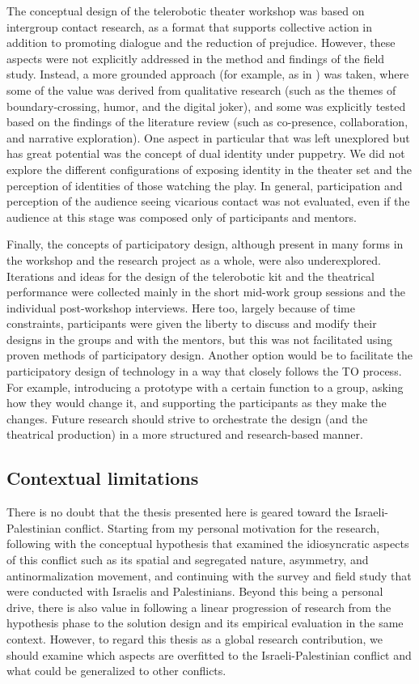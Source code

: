\documentclass[dissertation,math,vertlayout,pdfa,colorlinks]{aaltoseries}
\begin{document}
The conceptual design of the telerobotic theater workshop was based on intergroup contact research, as a format that supports collective action in addition to promoting dialogue and the reduction of prejudice. However, these aspects were not explicitly addressed in the method and findings of the field study. Instead, a more grounded approach (for example, as in \cite{glaserBasicsGroundedTheory1992}) was taken, where some of the value was derived from qualitative research (such as the themes of boundary-crossing, humor, and the digital joker), and some was explicitly tested based on the findings of the literature review (such as co-presence, collaboration, and narrative exploration). One aspect in particular that was left unexplored but has great potential was the concept of dual identity under puppetry. We did not explore the different configurations of exposing identity in the theater set and the perception of identities of those watching the play. In general, participation and perception of the audience seeing vicarious contact was not evaluated, even if the audience at this stage was composed only of participants and mentors.

Finally, the concepts of participatory design, although present in many forms in the workshop and the research project as a whole, were also underexplored. Iterations and ideas for the design of the telerobotic kit and the theatrical performance were collected mainly in the short mid-work group sessions and the individual post-workshop interviews. Here too, largely because of time constraints, participants were given the liberty to discuss and modify their designs in the groups and with the mentors, but this was not facilitated using proven methods of participatory design. Another option would be to facilitate the participatory design of technology in a way that closely follows the TO process. For example, introducing a prototype with a certain function to a group, asking how they would change it, and supporting the participants as they make the changes. Future research should strive to orchestrate the design (and the theatrical production) in a more structured and research-based manner.


\subsection{Contextual limitations}
There is no doubt that the thesis presented here is geared toward the Israeli-Palestinian conflict. Starting from my personal motivation for the research, following with the conceptual hypothesis that examined the idiosyncratic aspects of this conflict such as its spatial and segregated nature, asymmetry, and antinormalization movement, and continuing with the survey and field study that were conducted with Israelis and Palestinians. Beyond this being a personal drive, there is also value in following a linear progression of research from the hypothesis phase to the solution design and its empirical evaluation in the same context. However, to regard this thesis as a global research contribution, we should examine which aspects are overfitted to the Israeli-Palestinian conflict and what could be generalized to other conflicts.
\end{document}
